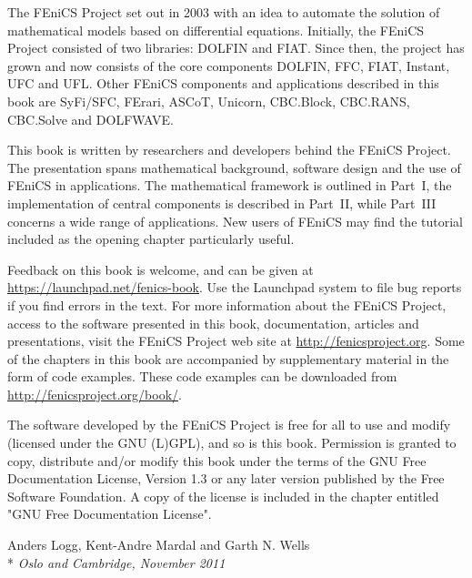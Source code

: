 \thispagestyle{empty}

The FEniCS Project set out in 2003 with an idea to automate the
solution of mathematical models based on differential equations.
Initially, the FEniCS Project consisted of two libraries: DOLFIN and
FIAT. Since then, the project has grown and now consists of the core
components DOLFIN, FFC, FIAT, Instant, UFC and UFL. Other FEniCS
components and applications described in this book are SyFi/SFC,
FErari, ASCoT, Unicorn, CBC.Block, CBC.RANS, CBC.Solve and DOLFWAVE.

This book is written by researchers and developers behind the FEniCS
Project. The presentation spans mathematical background, software
design and the use of FEniCS in applications. The mathematical
framework is outlined in Part~I, the implementation of central
components is described in Part~II, while Part~III concerns a wide
range of applications. New users of FEniCS may find the tutorial
included as the opening chapter particularly useful.

Feedback on this book is welcome, and can be given at
\url{https://launchpad.net/fenics-book}. Use the Launchpad system to
file bug reports if you find errors in the text. For more information
about the FEniCS Project, access to the software presented in this
book, documentation, articles and presentations, visit the FEniCS
Project web site at \url{http://fenicsproject.org}. Some of the
chapters in this book are accompanied by supplementary material in the
form of code examples. These code examples can be downloaded from
\url{http://fenicsproject.org/book/}.

The software developed by the FEniCS Project is free for all to use
and modify (licensed under the GNU (L)GPL), and so is this
book. Permission is granted to copy, distribute and/or modify this
book under the terms of the GNU Free Documentation License, Version
1.3 or any later version published by the Free Software Foundation. A
copy of the license is included in the chapter entitled "GNU Free
Documentation License".

\vspace{1em}

\noindent
Anders Logg, Kent-Andre Mardal and Garth N. Wells \\*
\emph{Oslo and Cambridge, November 2011}


\tableofcontents


